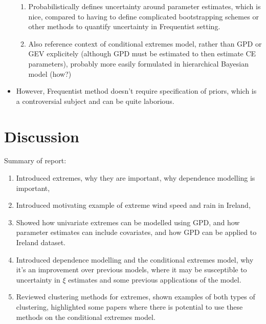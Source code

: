 \documentclass{article}
\numberwithin{equation}{section}
\begin{document}
\begin{itemize}
\begin{enumerate}
      \item Probabilistically defines uncertainty around parameter estimates, which is nice, compared to having to define complicated bootstrapping schemes or other methods to quantify uncertainty in Frequentist setting. 
      \item Also reference context of conditional extremes model, rather than GPD or GEV explicitely (although GPD must be estimated to then estimate CE parameters), probably more easily formulated in hierarchical Bayesian model (how?)
    \end{enumerate}
  \item However, Frequentist method doesn't require specification of priors, which is a controversial subject and can be quite laborious.  
\end{itemize}

\section{Discussion} \label{sec:discussion}

Summary of report:
\begin{itemize}
  \begin{enumerate}
    \item Introduced extremes, why they are important, why dependence modelling is important,
    \item Introduced motivating example of extreme wind speed and rain in Ireland,
    \item Showed how univariate extremes can be modelled using GPD, and how parameter estimates can include covariates, and how GPD can be applied to Ireland dataset. 
    \item Introduced dependence modelling and the conditional extremes model, why it's an improvement over previous models, where it may be susceptible to uncertainty in $\xi$ estimates and some previous applications of the model.
    \item Reviewed clustering methods for extremes, shown examples of both types of clustering, highlighted some papers where there is potential to use these methods on the conditional extremes model.
  \end{enumerate}
\end{itemize}
\end{document}
